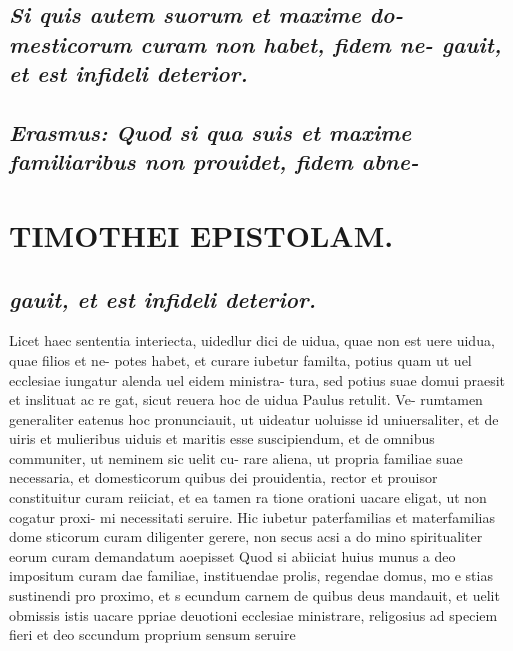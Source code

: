 \documentclass{article}
\begin{document}
\begin{pages}
\subsection*{\textit{Si quis autem suorum et maxime do- mesticorum curam non habet, fidem ne- gauit, et est infideli deterior. }}
{}
\subsection*{\textit{Erasmus: Quod si qua suis et maxime familiaribus non prouidet, fidem abne- }}
\section*{TIMOTHEI EPISTOLAM. }
\marginpar{[ p.121 ]}
{}
\subsection*{\textit{gauit, et est infideli deterior. }}\pstart Licet haec sententia interiecta, uidedlur dici de uidua, quae non est uere uidua, quae filios et ne- potes habet, et curare iubetur familta, potius quam ut uel ecclesiae iungatur alenda uel eidem ministra- tura, sed potius suae domui praesit et inslituat ac re gat, sicut reuera hoc de uidua Paulus retulit. Ve- rumtamen generaliter eatenus hoc pronunciauit, ut uideatur uoluisse id uniuersaliter, et de uiris et mulieribus uiduis et maritis esse suscipiendum, et de omnibus communiter, ut neminem sic uelit cu- rare aliena, ut propria familiae suae necessaria, et domesticorum quibus dei prouidentia, rector et prouisor constituitur curam reiiciat, et ea tamen ra tione orationi uacare eligat, ut non cogatur proxi- mi necessitati seruire.  \pend\pstart Hic iubetur paterfamilias et materfamilias dome sticorum curam diligenter gerere, non secus acsi a do mino spiritualiter eorum curam demandatum aoepisset Quod si abiiciat huius munus a deo impositum curam dae familiae, instituendae prolis, regendae domus, mo e stias sustinendi pro proximo, et s ecundum carnem de quibus deus mandauit, et uelit obmissis istis uacare ppriae deuotioni ecclesiae ministrare, religosius ad speciem fieri et deo sccundum proprium sensum seruire  \pend

\end{pages}
\end{document}
